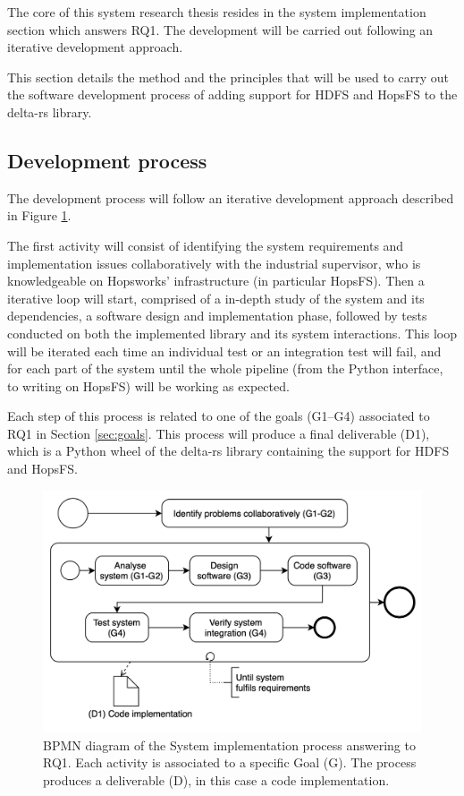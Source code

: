 The core of this system research thesis resides in the system implementation section which answers RQ1. The development will be carried out following an iterative development approach.

This section details the method and the principles that will be used to carry out the software development process of adding support for \gls{HDFS} and \gls{HopsFS} to the delta-rs library.

\subsection{Development process}
The development process will follow an iterative development approach described in Figure \ref{fig:DevProcessRQ1}. 

The first activity will consist of identifying the system requirements and implementation issues collaboratively with the industrial supervisor, who is knowledgeable on Hopsworks' infrastructure (in particular \gls{HopsFS}). Then a iterative loop will start, comprised of a in-depth study of the system and its dependencies, a software design and implementation phase, followed by tests conducted on both the implemented library and its system interactions. This loop will be iterated each time an individual test or an integration test will fail, and for each part of the system until the whole pipeline (from the Python interface, to writing on \gls{HopsFS}) will be working as expected. 

Each step of this process is related to one of the goals (G1--G4) associated to RQ1 in Section \ref{sec:goals}. This process will produce a final deliverable (D1), which is a Python wheel of the delta-rs library containing the support for \gls{HDFS} and \gls{HopsFS}.

\begin{figure}[!ht]
    \begin{center}
      \includegraphics[width=\textwidth]{figures/3-method/research_process_rq1.png}
    \caption{\gls{BPMN} diagram of the System implementation process answering to RQ1. Each activity is associated to a specific Goal (\gls{G}). The process produces a deliverable (\gls{D}), in this case a code implementation.}
    \label{fig:DevProcessRQ1}
    \end{center}
\end{figure}

